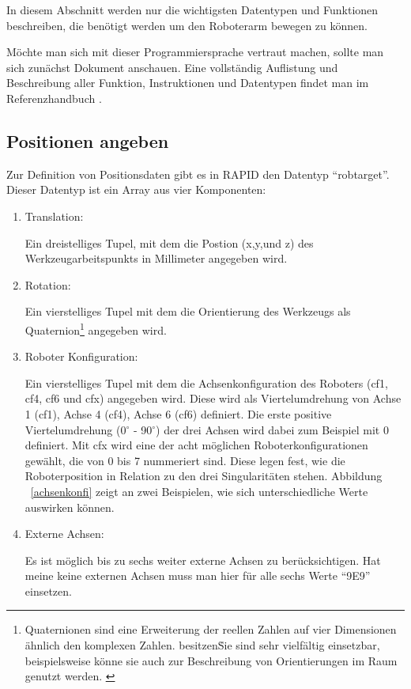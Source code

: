 In diesem Abschnitt werden nur die wichtigsten Datentypen und Funktionen beschreiben, die benötigt werden um den Roboterarm bewegen zu können. 

Möchte man sich mit dieser Programmiersprache vertraut machen, sollte man sich zunächst Dokument \cite{rapid1} anschauen. Eine vollständig Auflistung und Beschreibung aller Funktion, Instruktionen und Datentypen findet man im Referenzhandbuch \cite{rapid2}.

\subsection{Positionen angeben}
Zur Definition von Positionsdaten gibt es in RAPID den Datentyp \enquote{robtarget}. Dieser Datentyp ist ein Array aus vier Komponenten:
\begin{enumerate}
\item Translation:

Ein dreistelliges Tupel, mit dem die Postion (x,y,und z) des Werkzeugarbeitspunkts in Millimeter angegeben wird.
\item Rotation:

Ein vierstelliges Tupel mit dem die Orientierung des Werkzeugs als Quaternion\footnote{Quaternionen sind eine Erweiterung der reellen Zahlen auf vier Dimensionen ähnlich den komplexen Zahlen. besitzen\.  Sie  sind  sehr  vielfältig  einsetzbar, beispielsweise könne sie auch zur Beschreibung von Orientierungen im Raum genutzt werden. \cite{quaternion}} angegeben wird.

\item Roboter Konfiguration:

Ein vierstelliges Tupel mit dem die Achsenkonfiguration des Roboters (cf1, cf4, cf6 und cfx) angegeben wird. Diese wird als Viertelumdrehung von Achse 1 (cf1), Achse 4 (cf4), Achse 6 (cf6) definiert. Die erste positive Viertelumdrehung (0$ ^\circ $ - 90$ ^\circ $) der drei Achsen wird dabei zum Beispiel mit 0 definiert. Mit cfx wird eine der acht möglichen Roboterkonfigurationen gewählt, die von 0 bis 7 nummeriert sind. Diese legen fest, wie die Roboterposition in Relation zu den drei Singularitäten stehen. Abbildung ~\ref{achsenkonfi} zeigt an zwei Beispielen, wie sich unterschiedliche Werte auswirken können.  
\item Externe Achsen:

Es ist möglich bis zu sechs weiter externe Achsen zu berücksichtigen. Hat meine keine externen Achsen muss man hier für alle sechs Werte \enquote{9E9} einsetzen. 
\end{enumerate} 

